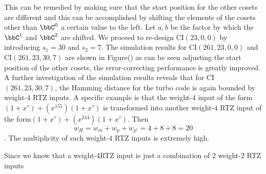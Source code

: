 \documentclass[11pt, oneside, dvipdfmx]{book}
\begin{document}
This can be remedied by making sure that the start position for the other cosets are different and this can be accomplished by shifting the elements of the cosets other than $\bbC^0$ a certain value to the left. Let $a,b$ be the factor by which the $\bbC^1$ and $\bbC^2$ are shifted.  We proceed to re-design  CI$(23,0,0)$  by introducing $s_1=30$ and $s_2=7$.
The simulation results for CI$(261,23,0,0)$ and CI$(261,23,30,7)$ are shown in Figure() as can be seen adjusting the start position of the other cosets, the error-correcting performance is greatly improved. A further investigation of the simulation results reveals that for CI$(261,23,30,7)$, the Hamming distance for the turbo code is again bounded by weight-$4$ RTZ inputs. A specific example is that the weight-$4$ input of the form $(1+x^{\tau})+(x^{155})(1+x^{\tau})$ is transformed into another weight-$4$ RTZ input of the form$ (1+x^{\tau})+(x^{244})(1+x^{\tau})$. Then $$w_H=w_m+w_p+w_{p'}=4+8+8=20$$. The multiplicity of such weight-$4$ RTZ inputs is extremely high. 

Since we know that a weight-$4$RTZ input is just a combination of 2 weight-$2$ RTZ inputs 

 
\end{document}

